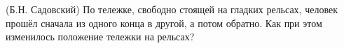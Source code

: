 (Б.Н. Садовский)
По тележке, свободно стоящей на гладких рельсах, человек прошёл сначала
из одного конца в другой, а потом обратно. Как при этом изменилось
положение тележки на рельсах?
